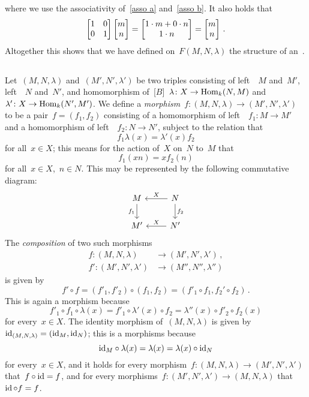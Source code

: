 where we use the associativity of~\eqref{asso a} and~\eqref{asso b}.
It also holds that
\[
  \begin{bmatrix}
    1 & 0 \\
    0 & 1
  \end{bmatrix}
  \begin{bmatrix} m \\ n \end{bmatrix}
  =
  \begin{bmatrix} 1 \cdot m + 0 \cdot n \\ 1 \cdot n \end{bmatrix}
  =
  \begin{bmatrix} m \\ n \end{bmatrix} \,.
\]
Altogether this shows that we have defined on~$F(M,N,\lambda)$ the structure of an~{}.





\subsection{}

Let~$(M, N, \lambda)$ and~$(M', N', \lambda')$ be two triples consisting of left~{}~$M$ and~$M'$, left~{}~$N$ and~$N'$, and homomorphism of~{[$B$]}~$\lambda \colon X \to \operatorname{Hom}_k(N, M)$ and~$\lambda' \colon X \to \operatorname{Hom}_k(N', M')$.
We define a \emph{morphism}~$f \colon (M, N, \lambda) \to (M', N', \lambda')$ to be a pair~$f = (f_1, f_2)$ consisting of a homomorphism of left~{}~$f_1 \colon M \to M'$ and a homomorphism of left~{}~$f_2 \colon N \to N'$, subject to the relation that
\[
  f_1 \lambda(x) = \lambda'(x) f_2
\]
for all~$x \in X$; this means for the action of~$X$ on~$N$ to~$M$ that
\[
    f_1(xn)
  = x f_2(n)
\]
for all~$x \in X$,~$n \in N$.
This may be represented by the following commutative diagram:
\[
  \begin{tikzcd}
      M
      \arrow{d}[left]{f_1}
    & N
      \arrow{l}[above]{X}
      \arrow{d}[right]{f_2}
    \\
      M'
    & N'
      \arrow{l}[above]{X}
  \end{tikzcd}
\]
The \emph{composition} of two such morphisms
\begin{align*}
  f   \colon (M, N, \lambda)    &\to  (M', N', \lambda') \,,  \\
  f'  \colon (M', N', \lambda') &\to  (M'', N'', \lambda'')
\end{align*}
is given by
\[
    f' \circ f
  = (f'_1, f'_2) \circ (f_1, f_2)
  = (f'_1 \circ f_1, f_2' \circ f_2) \,.
\]
This is again a morphism because
\[
    f'_1 \circ f_1 \circ \lambda(x)
  = f'_1 \circ \lambda'(x) \circ f_2
  = \lambda''(x) \circ f'_2 \circ f_2(x)
\]
for every~$x \in X$.
The identity morphism of~$(M, N, \lambda)$ is given by~$\operatorname{id}_{(M,N,\lambda)} = (\operatorname{id}_M, \operatorname{id}_N)$;
this is a morphisms because
\[
    {\operatorname{id}_M} \circ \lambda(x)
  = \lambda(x)
  = \lambda(x) \circ \operatorname{id}_N
\]
for every~$x \in X$, and it holds for every morphism~$f \colon (M,N,\lambda) \to (M',N',\lambda')$ that~$f \circ \operatorname{id} = f$, and for every morphisms~$f \colon (M',N',\lambda') \to (M,N,\lambda)$ that~$\operatorname{id} \circ f = f$.

